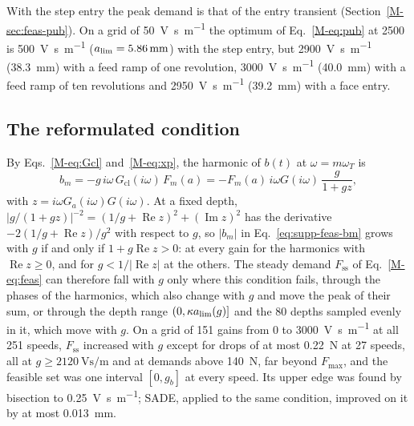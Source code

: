 With the step entry the peak demand is that of the entry transient (Section~\ref{M-sec:feas-pub}). On a grid of \SI{50}{\volt\second\per\metre} the optimum of Eq.~\eqref{M-eq:pub} at \SI{2500}{\rpm} is \SI{500}{\volt\second\per\metre} ($a_{\lim}=\SI{5.86}{\milli\metre}$) with the step entry, but \SI{2900}{\volt\second\per\metre} (\SI{38.3}{\milli\metre}) with a feed ramp of one revolution, \SI{3000}{\volt\second\per\metre} (\SI{40.0}{\milli\metre}) with a feed ramp of ten revolutions and \SI{2950}{\volt\second\per\metre} (\SI{39.2}{\milli\metre}) with a face entry.

\subsection{The reformulated condition}\label{supp:feas-new}

By Eqs.~\eqref{M-eq:Gcl} and~\eqref{M-eq:xp}, the harmonic of $b(t)$ at $\omega=m\omega_T$ is
\begin{equation}\label{eq:supp-feas-bm}
  b_m=-g\,i\omega\,G_{\mathrm{cl}}(i\omega)\,F_m(a)=-F_m(a)\,i\omega G(i\omega)\,\frac{g}{1+gz},
\end{equation}
with $z=i\omega G_a(i\omega)G(i\omega)$. At a fixed depth, $\lvert g/(1+gz)\rvert^{-2}=(1/g+\operatorname{Re}z)^2+(\operatorname{Im}z)^2$ has the derivative $-2(1/g+\operatorname{Re}z)/g^2$ with respect to $g$, so $\lvert b_m\rvert$ in Eq.~\eqref{eq:supp-feas-bm} grows with $g$ if and only if $1+g\operatorname{Re}z>0$: at every gain for the harmonics with $\operatorname{Re}z\ge0$, and for $g<1/\lvert\operatorname{Re}z\rvert$ at the others. The steady demand $F_{\mathrm{ss}}$ of Eq.~\eqref{M-eq:feas} can therefore fall with $g$ only where this condition fails, through the phases of the harmonics, which also change with $g$ and move the peak of their sum, or through the depth range $(0,\kappa a_{\lim}(g)]$ and the 80 depths sampled evenly in it, which move with $g$. On a grid of 151 gains from 0 to \SI{3000}{\volt\second\per\metre} at all 251 speeds, $F_{\mathrm{ss}}$ increased with $g$ except for drops of at most \SI{0.22}{\newton} at 27 speeds, all at $g\ge\SI{2120}{\volt\second\per\metre}$ and at demands above \SI{140}{\newton}, far beyond $F_{\max}$, and the feasible set was one interval $[0,g_b]$ at every speed. Its upper edge was found by bisection to \SI{0.25}{\volt\second\per\metre}; SADE, applied to the same condition, improved on it by at most \SI{0.013}{\milli\metre}.

